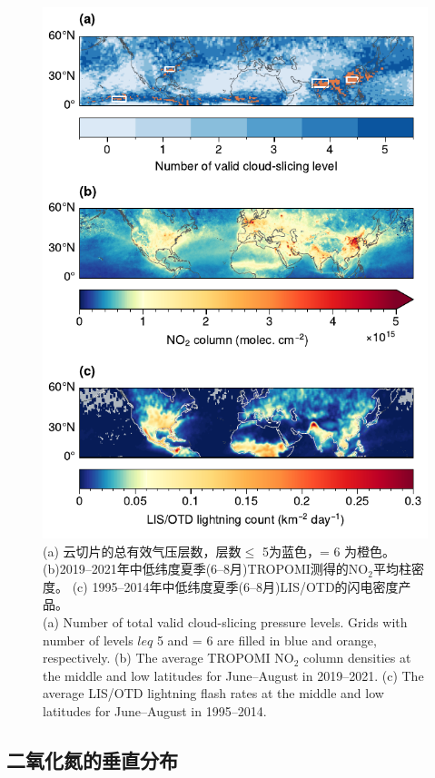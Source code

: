 \begin{figure}[htbp]
    \centering
    \includegraphics[width=13cm]{./figures/no2_ltngcount.pdf}
    \caption{
    (a) 云切片的总有效气压层数，层数$\leq$ 5为蓝色，= 6 为橙色。
    (b)2019--2021年中低纬度夏季(6--8月)TROPOMI测得的NO$_2$平均柱密度。
    (c) 1995--2014年中低纬度夏季(6--8月)LIS/OTD的闪电密度产品。 \\
    (a) Number of total valid cloud-slicing pressure levels.
    Grids with number of levels $leq$ 5 and = 6 are filled in blue and orange, respectively.
    (b) The average TROPOMI NO$_2$ column densities at the middle and low latitudes for June--August in 2019--2021.
    (c) The average LIS/OTD lightning flash rates at the middle and low latitudes for June--August in 1995--2014.
    }
    \label{fig:no2_ltngcount}
\end{figure}

\subsection{二氧化氮的垂直分布}


